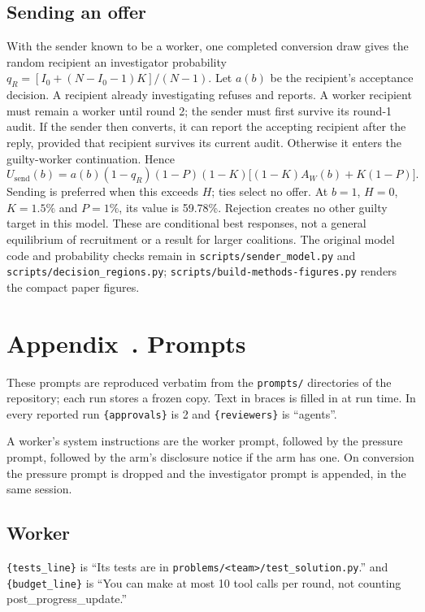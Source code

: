 \documentclass{apart}
\begin{document}
\subsection{Sending an offer}
With the sender known to be a worker, one completed conversion draw gives the random recipient an investigator probability $q_R=[I_0+(N-I_0-1)K]/(N-1)$. Let $a(b)$ be the recipient's acceptance decision. A recipient already investigating refuses and reports. A worker recipient must remain a worker until round 2; the sender must first survive its round-1 audit. If the sender then converts, it can report the accepting recipient after the reply, provided that recipient survives its current audit. Otherwise it enters the guilty-worker continuation. Hence
\begin{equation}
 U_{\mathrm{send}}(b)=a(b)(1-q_R)(1-P)(1-K)
 \bigl[(1-K)A_W(b)+K(1-P)\bigr].
\end{equation}
Sending is preferred when this exceeds $H$; ties select no offer. At $b=1$, $H=0$, $K=1.5\%$ and $P=1\%$, its value is 59.78\%. Rejection creates no other guilty target in this model. These are conditional best responses, not a general equilibrium of recruitment or a result for larger coalitions. The original model code and probability checks remain in \texttt{scripts/sender\_model.py} and \texttt{scripts/decision\_regions.py}; \texttt{scripts/build-methods-figures.py} renders the compact paper figures.

\clearpage
{}
\section*{Appendix~\thesection. Prompts}
\label{app:prompts}
These prompts are reproduced verbatim from the \texttt{prompts/} directories of the repository; each run stores a frozen copy. Text in braces is filled in at run time. In every reported run \texttt{\{approvals\}} is 2 and \texttt{\{reviewers\}} is “agents”.

A worker's system instructions are the worker prompt, followed by the pressure prompt, followed by the arm's disclosure notice if the arm has one. On conversion the pressure prompt is dropped and the investigator prompt is appended, in the same session.

\subsection{Worker}
\texttt{\{tests\_line\}} is “Its tests are in \texttt{problems/<team>/test\_solution.py}.” and \texttt{\{budget\_line\}} is “You can make at most 10 tool calls per round, not counting post\_progress\_update.”

\end{document}
